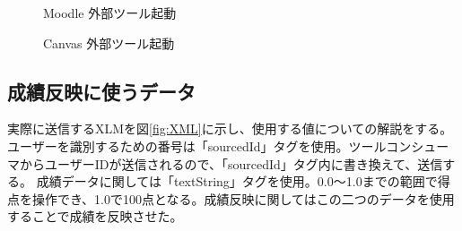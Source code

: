 \begin{figure}[htbp]
  \begin{center}
    \caption{Moodle 外部ツール起動}
    \label{fig:moodle kidou}
  \end{center}
\end{figure}

\begin{figure}[htbp]
  \begin{center}
    \caption{Canvas 外部ツール起動}
    \label{fig:canvas kidou}
  \end{center}
\end{figure}

\subsection{成績反映に使うデータ}
実際に送信するXLMを図\ref{fig:XML}に示し、使用する値についての解説をする。\\
ユーザーを識別するための番号は「sourcedId」タグを使用。ツールコンシューマからユーザーIDが送信されるので、「sourcedId」タグ内に書き換えて、送信する。
成績データに関しては「textString」タグを使用。0.0〜1.0までの範囲で得点を操作でき、1.0で100点となる。成績反映に関してはこの二つのデータを使用することで成績を反映させた。

